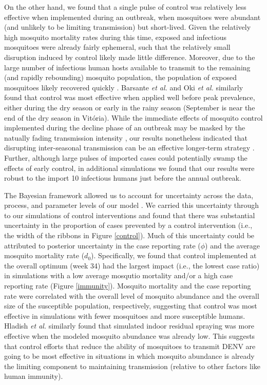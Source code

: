\documentclass[10pt,letterpaper]{article}
\begin{document}
On the other hand, we found that a single pulse of control was relatively less effective when implemented during an outbreak, when mosquitoes were abundant (and unlikely to be limiting transmission) but short-lived.
Given the relatively high mosquito mortality rates during this time, exposed and infectious mosquitoes were already fairly ephemeral, such that the relatively small disruption induced by control likely made little difference.
Moreover, due to the large number of infectious human hosts available to transmit to the remaining (and rapidly rebounding) mosquito population, the population of exposed mosquitoes likely recovered quickly \cite{Newton1992, Burattini2008}.
Barsante \emph{et al.} \cite{Barsante2015} and Oki \emph{et al.} \cite{Oki2011} similarly found that control was most effective when applied well before peak prevalence, either during the dry season \cite{Barsante2015} or early in the rainy season \cite{Oki2011} (September is near the end of the dry season in Vit\'oria).
While the immediate effects of mosquito control implemented during the decline phase of an outbreak may be masked by the natually fading transmission intensity \cite{Stoddard2014}, our results nonetheless indicated that disrupting inter-seasonal transmission can be an effective longer-term strategy \cite{Hladish2018}.
Further, although large pulses of imported cases could potentially swamp the effects of early control, in additional simulations we found that our results were robust to the import 10 infectious humans just before the annual outbreak.

The Bayesian framework allowed us to account for uncertainty across the data, process, and parameter levels of our model \cite{Berliner1996}.
We carried this uncertainty through to our simulations of control interventions \cite{Elderd2006} and found that there was substantial uncertainty in the proportion of cases prevented by a control intervention (i.e., the width of the ribbons in Figure \ref{control}).
Much of this uncertainty could be attributed to posterior uncertainty in the case reporting rate ($\phi$) and the average mosquito mortality rate ($d_0$).
Specifically, we found that control implemented at the overall optimum (week 34) had the largest impact (i.e., the lowest case ratio) in simulations with a low average  mosqutio mortality and/or a high case reporting rate (Figure \ref{immunity}).
Mosquito mortality and the case reporting rate were correlated with the overall level of mosquito abundance and the overall size of the susceptible population, respectively, suggesting that control was most effective in simulations with fewer mosquitoes and more susceptible humans.  
Hladish \emph{et al.} \cite{Hladish2018} similarly found that simulated indoor residual spraying was more effective when the modeled mosquito abundance was already low.
This suggests that control efforts that reduce the ability of mosquitoes to transmit DENV are going to be most effective in situations in which mosquito abundance is already the limiting component to maintaining transmission (relative to other factors like human immunity).
\end{document}
